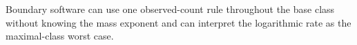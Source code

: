 Boundary software can use one observed-count rule throughout the base class without knowing the mass exponent and can interpret the logarithmic rate as the maximal-class worst case.